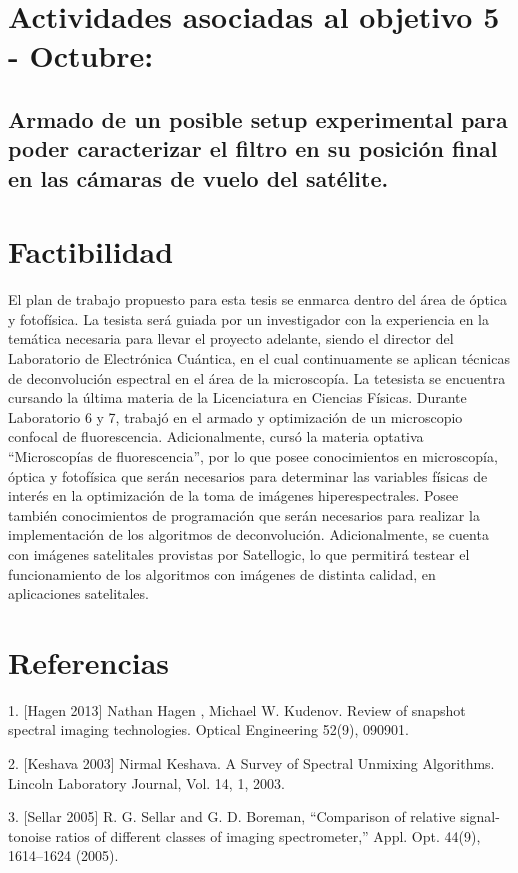 \documentclass{ctuthesis}
\begin{document}
\section*{Actividades asociadas al objetivo 5 - Octubre:}
\subsection*{Armado de un posible setup 
	experimental para poder caracterizar el filtro en su posición final
	en las cámaras de vuelo del satélite.}

\section*{Factibilidad}
El plan de trabajo propuesto para esta tesis se enmarca dentro del área de óptica y fotofísica. La tesista será guiada por un investigador con la experiencia en la temática necesaria para llevar el proyecto adelante, siendo el director del Laboratorio de Electrónica Cuántica, en el cual continuamente se aplican técnicas de deconvolución espectral en el área de la microscopía.
La tetesista se encuentra cursando la última materia de la Licenciatura en Ciencias Físicas. Durante Laboratorio 6 y 7, trabajó en el armado y optimización de un microscopio confocal de fluorescencia. Adicionalmente, cursó la materia optativa “Microscopías de fluorescencia”, por lo que posee conocimientos en microscopía, óptica y fotofísica que serán necesarios para determinar las variables físicas de interés en la optimización de la toma de imágenes hiperespectrales. Posee también conocimientos de programación que serán necesarios para realizar la implementación de los algoritmos de deconvolución.
Adicionalmente, se cuenta con imágenes satelitales provistas por Satellogic, lo que permitirá testear el funcionamiento de los algoritmos con imágenes de distinta calidad, en aplicaciones satelitales. 
\section*{Referencias}
1. [Hagen 2013] Nathan Hagen , Michael W. Kudenov. Review of snapshot spectral imaging technologies. Optical Engineering 52(9), 090901.

2. [Keshava 2003] Nirmal Keshava. A Survey of Spectral Unmixing Algorithms. Lincoln Laboratory Journal, Vol. 14, 1, 2003.

3. [Sellar 2005] R. G. Sellar and G. D. Boreman, “Comparison of relative signal-tonoise
ratios of different classes of imaging spectrometer,” Appl. Opt. 44(9), 1614–1624 (2005).
\end{document}
